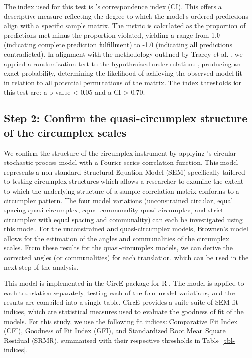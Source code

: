 \documentclass[
  authoryear,
  preprint,
  3p]{elsarticle}
\begin{document}
The index used for this test is \citet{Hubert1987Evaluating}'s
correspondence index (CI). This offers a descriptive measure reflecting
the degree to which the model's ordered predictions align with a
specific sample matrix. The metric is calculated as the proportion of
predictions met minus the proportion violated, yielding a range from 1.0
(indicating complete prediction fulfillment) to -1.0 (indicating all
predictions contradicted). In alignment with the methodology outlined by
Tracey et al. \citep{Tracey1997RANDALL}, we applied a randomization test
to the hypothesized order relations \citep{Hubert1987Evaluating},
producing an exact probability, determining the likelihood of achieving
the observed model fit in relation to all potential permutations of the
matrix. The index thresholds for this test are: a p-value \textless{}
0.05 and a CI \textgreater{} 0.70.

\subsection{Step 2: Confirm the quasi-circumplex structure of the
circumplex
scales}\label{step-2-confirm-the-quasi-circumplex-structure-of-the-circumplex-scales}

We confirm the structure of the circumplex instrument by applying
\citet{Browne1992Circumplex}'s circular stochastic process model with a
Fourier series correlation function. This model represents a
non-standard Structural Equation Model (SEM) specifically tailored to
testing circumplex structures which allows a researcher to examine the
extent to which the underlying structure of a sample correlation matrix
conforms to a circumplex pattern. The four model variations
(unconstrained circular, equal spacing quasi-circumplex,
equal-communality quasi-circumplex, and strict circumplex with equal
spacing and communality) can each be investigated using this model. For
the unconstrained and quasi-circumplex models, Brownen's model allows
for the estimation of the angles and communalities of the circumplex
scales. From these results for the quasi-circumplex models, we can
derive the corrected angles (or communalities) for each translation,
which can be used in the next step of the analysis.

This model is implemented in the CircE package \citep{Grassi2010CircE}
for R \citep{RCT2018R}. The model is applied to each translation
separately, testing each of the four model variations, and the results
are compiled into a single table. CircE provides a suite suite of SEM
fit indices, which are statistical measures used to evaluate the
goodness of fit of the models. For this study, we use the following fit
indices: Comparative Fit Index (CFI), Goodness of Fit Index (GFI), and
Standardized Root Mean Square Residual (SRMR), summarised with their
respective thresholds in Table~\ref{tbl-indices}.
\end{document}
